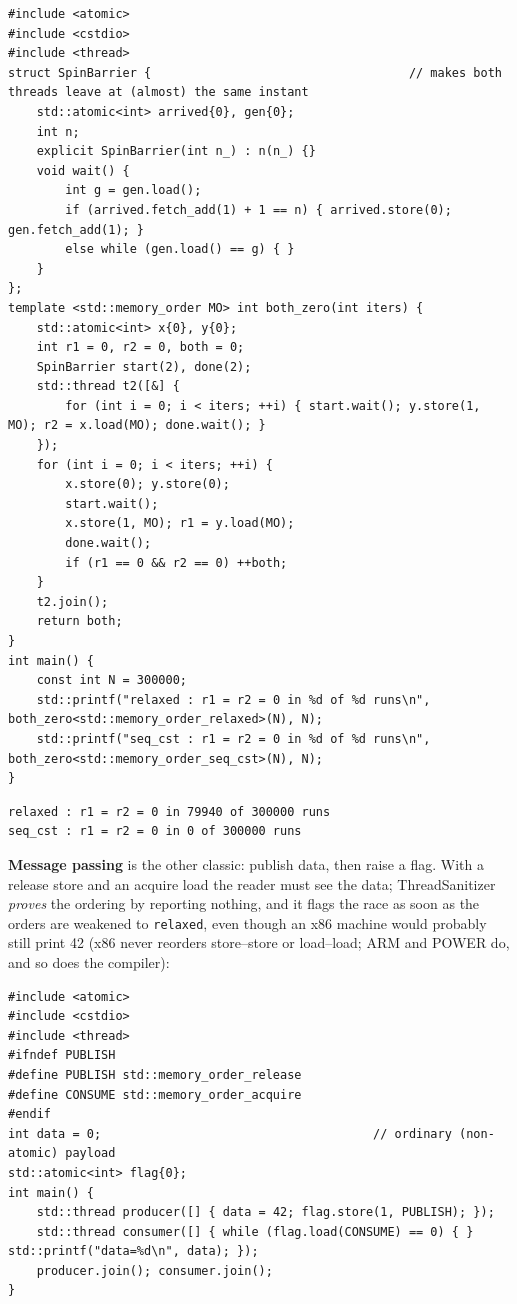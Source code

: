 \documentclass[10pt,a4paper,openany,oneside]{report}
\begin{document}
\begin{lstlisting}[language={[11]C++},basicstyle=\ttfamily\scriptsize]
#include <atomic>
#include <cstdio>
#include <thread>
struct SpinBarrier {                                    // makes both threads leave at (almost) the same instant
    std::atomic<int> arrived{0}, gen{0};
    int n;
    explicit SpinBarrier(int n_) : n(n_) {}
    void wait() {
        int g = gen.load();
        if (arrived.fetch_add(1) + 1 == n) { arrived.store(0); gen.fetch_add(1); }
        else while (gen.load() == g) { }
    }
};
template <std::memory_order MO> int both_zero(int iters) {
    std::atomic<int> x{0}, y{0};
    int r1 = 0, r2 = 0, both = 0;
    SpinBarrier start(2), done(2);
    std::thread t2([&] {
        for (int i = 0; i < iters; ++i) { start.wait(); y.store(1, MO); r2 = x.load(MO); done.wait(); }
    });
    for (int i = 0; i < iters; ++i) {
        x.store(0); y.store(0);
        start.wait();
        x.store(1, MO); r1 = y.load(MO);
        done.wait();
        if (r1 == 0 && r2 == 0) ++both;
    }
    t2.join();
    return both;
}
int main() {
    const int N = 300000;
    std::printf("relaxed : r1 = r2 = 0 in %d of %d runs\n", both_zero<std::memory_order_relaxed>(N), N);
    std::printf("seq_cst : r1 = r2 = 0 in %d of %d runs\n", both_zero<std::memory_order_seq_cst>(N), N);
}
\end{lstlisting}
\begin{lstlisting}[style=out,basicstyle=\ttfamily\scriptsize,title={Captured output}]
relaxed : r1 = r2 = 0 in 79940 of 300000 runs
seq_cst : r1 = r2 = 0 in 0 of 300000 runs
\end{lstlisting}
\textbf{Message passing} is the other classic: publish data, then raise a flag. With a release store and an acquire load the reader must see the data; ThreadSanitizer \emph{proves} the ordering by reporting nothing, and it flags the race as soon as the orders are weakened to \texttt{relaxed}, even though an x86 machine would probably still print 42 (x86 never reorders store--store or load--load; ARM and POWER do, and so does the compiler):
\begin{lstlisting}[language={[11]C++},title={mp.cpp}]
#include <atomic>
#include <cstdio>
#include <thread>
#ifndef PUBLISH
#define PUBLISH std::memory_order_release
#define CONSUME std::memory_order_acquire
#endif
int data = 0;                                      // ordinary (non-atomic) payload
std::atomic<int> flag{0};
int main() {
    std::thread producer([] { data = 42; flag.store(1, PUBLISH); });
    std::thread consumer([] { while (flag.load(CONSUME) == 0) { } std::printf("data=%d\n", data); });
    producer.join(); consumer.join();
}
\end{lstlisting}
\end{document}
